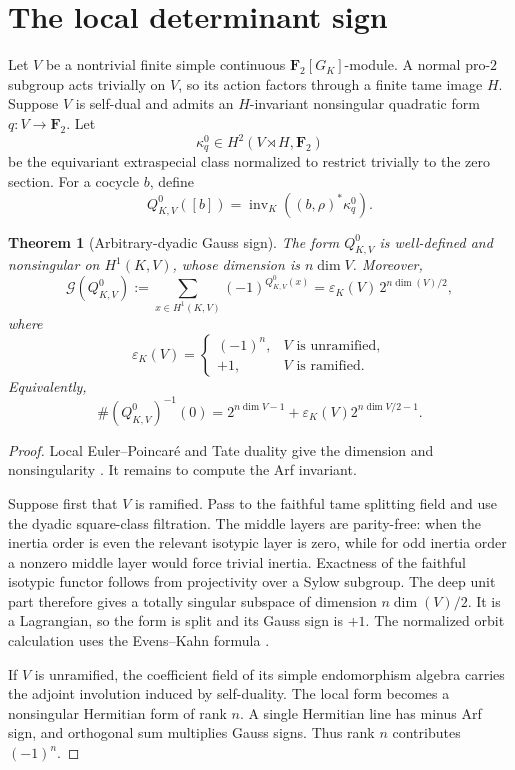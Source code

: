 \documentclass[11pt,reqno]{amsart}
\newtheorem{theorem}{Theorem}[section]
\theoremstyle{definition}
\theoremstyle{remark}
\numberwithin{equation}{section}
\newcommand{\F}{\mathbf F}
\newcommand{\inv}{\operatorname{inv}}
\newcommand{\eps}{\varepsilon}
\newcommand{\Gsum}{\mathcal G}
\begin{document}
\section{The local determinant sign}\label{sec:local-gauss}

Let \(V\) be a nontrivial finite simple continuous
\(\F_2[G_K]\)-module.  A normal pro-\(2\) subgroup acts trivially on
\(V\), so its action factors through a finite tame image \(H\).  Suppose
\(V\) is self-dual and admits an \(H\)-invariant nonsingular quadratic
form \(q:V\to\F_2\).  Let
\[
 \kappa_q^0\in H^2(V\rtimes H,\F_2)
\]
be the equivariant extraspecial class normalized to restrict trivially
to the zero section.  For a cocycle \(b\), define
\begin{equation}\label{eq:local-Q}
 Q^0_{K,V}([b])
 =\inv_K\!\left((b,\rho)^*\kappa_q^0\right).
\end{equation}

\begin{theorem}[Arbitrary-dyadic Gauss sign]\label{thm:local-gauss}
The form \(Q^0_{K,V}\) is well-defined and nonsingular on
\(H^1(K,V)\), whose dimension is \(n\dim V\).  Moreover,
\begin{equation}\label{eq:local-gauss}
 \Gsum(Q^0_{K,V})
 :=\sum_{x\in H^1(K,V)}(-1)^{Q^0_{K,V}(x)}
 =\eps_K(V)\,2^{n\dim(V)/2},
\end{equation}
where
\begin{equation}\label{eq:local-sign}
 \eps_K(V)=
 \begin{cases}
 (-1)^n,&V\text{ is unramified},\\
 +1,&V\text{ is ramified}.
 \end{cases}
\end{equation}
Equivalently,
\[
 \#(Q^0_{K,V})^{-1}(0)
 =2^{n\dim V-1}+\eps_K(V)2^{n\dim V/2-1}.
\]
\end{theorem}

\begin{proof}
Local Euler--Poincar\'e and Tate duality give the dimension and
nonsingularity \cite[Chapter VII]{NSW}.  It remains to compute the Arf
invariant.

Suppose first that \(V\) is ramified.  Pass to the faithful tame
splitting field and use the dyadic square-class filtration.  The middle
layers are parity-free: when the inertia order is even the relevant
isotypic layer is zero, while for odd inertia order a nonzero middle
layer would force trivial inertia.  Exactness of the faithful isotypic
functor follows from projectivity over a Sylow subgroup.  The deep unit
part therefore gives a totally singular subspace of dimension
\(n\dim(V)/2\).  It is a Lagrangian, so the form is split and its Gauss
sign is \(+1\).  The normalized orbit calculation uses the
Evens--Kahn formula \cite{Evens1963,Kahn1984,Kozlowski1984}.

If \(V\) is unramified, the coefficient field of its simple endomorphism
algebra carries the adjoint involution induced by self-duality.
The local form becomes a nonsingular Hermitian form of rank \(n\).  A
single Hermitian line has minus Arf sign, and orthogonal sum multiplies
Gauss signs.  Thus rank \(n\) contributes \((-1)^n\).
\end{proof}
\end{document}
